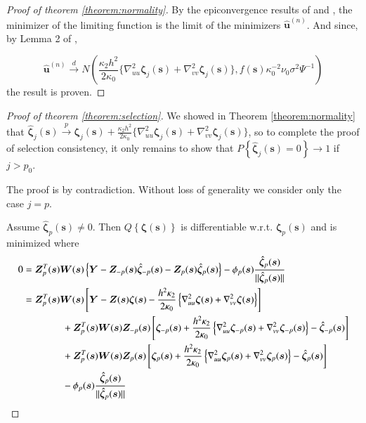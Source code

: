 \documentclass[authoryear, review, 11pt]{elsarticle}
\begin{document}
\begin{proof}[Proof of theorem \ref{theorem:normality}]
            By the epiconvergence results of \cite{Geyer-1994} and \cite{Knight-Fu-2000}, the minimizer of the limiting function is the limit of the minimizers $\hat{\bm{u}}^{(n)}$. And since, by Lemma 2 of \cite{Sun-Yan-Zhang-Lu-2014}, 

            \begin{equation}
                \hat{\bm{u}}^{(n)} \xrightarrow{d} N \left(\frac{\kappa_2 h^2}{2 \kappa_0} \{ \nabla_{uu}^2 \bm{\zeta}_j (\bm{s}) + \nabla_{vv}^2 \bm{\zeta}_j (\bm{s}) \}, f(\bm{s}) \kappa_0^{-2} \nu_0 \sigma^2 \Psi^{-1} \right)
            \end{equation}
            the result is proven.
        \end{proof}

        \begin{proof}[Proof of theorem \ref{theorem:selection}] 
            We showed in Theorem \ref{theorem:normality} that $\hat{\bm{\zeta}}_j (\bm{s}) \xrightarrow{p} \bm{\zeta}_j (\bm{s}) + \frac{\kappa_2 h^2}{2 \kappa_0} \{ \nabla_{uu}^2 \bm{\zeta}_j (\bm{s}) + \nabla_{vv}^2 \bm{\zeta}_j (\bm{s}) \}$, so to complete the proof of selection consistency, it only remains to show that $P \left\{ \hat{\bm{\zeta}}_j (\bm{s}) = 0 \right\} \to 1$ if $j > p_0$.
            
            The proof is by contradiction. Without loss of generality we consider only the case $j=p$.

            Assume $\hat{\bm{\zeta}}_p(\bm{s}) \ne 0$. Then $Q \left\{ \bm{\zeta}(\bm{s}) \right\}$ is differentiable w.r.t. $\bm{\zeta}_p(\bm{s})$ and is minimized where
            \begin{align}
                0 &= \bm{Z}_p^T(\bm{s}) \bm{W}(\bm{s}) \left\{ \bm{Y} - \bm{Z}_{-p}(\bm{s}) \hat{\bm{\zeta}}_{-p}(\bm{s}) - \bm{Z}_p(\bm{s}) \hat{\bm{\zeta}}_p(\bm{s}) \right\} - \phi_p(\bm{s}) \frac{ \hat{\bm{\zeta}}_p(\bm{s}) }{\| \hat{\bm{\zeta}}_p(\bm{s}) \|} \notag \\
                &= \bm{Z}_p^T(\bm{s}) \bm{W}(\bm{s}) \left[ \bm{Y} - \bm{Z}(\bm{s}) \bm{\zeta}(\bm{s}) - \frac{h^2 \kappa_2}{2 \kappa_0} \left\{ \nabla^2_{uu} \bm{\zeta}(\bm{s}) + \nabla^2_{vv} \bm{\zeta}(\bm{s}) \right\} \right] \notag \\
                &\mkern+72mu+ \bm{Z}_p^T(\bm{s}) \bm{W}(\bm{s}) \bm{Z}_{-p}(\bm{s}) \left[ \bm{\zeta}_{-p}(\bm{s}) + \frac{h^2 \kappa_2}{2 \kappa_0} \left\{ \nabla^2_{uu} \bm{\zeta}_{-p}(\bm{s}) + \nabla^2_{vv} \bm{\zeta}_{-p}(\bm{s}) \right\} - \hat{\bm{\zeta}}_{-p}(\bm{s}) \right] \notag \\
                &\mkern+72mu+ \bm{Z}_p^T(\bm{s}) \bm{W}(\bm{s}) \bm{Z}_p(\bm{s}) \left[ \bm{\zeta}_p(\bm{s}) + \frac{h^2 \kappa_2}{2 \kappa_0} \left\{ \nabla^2_{uu} \bm{\zeta}_p(\bm{s}) + \nabla^2_{vv} \bm{\zeta}_p(\bm{s}) \right\} - \hat{\bm{\zeta}}_p(\bm{s}) \right]  \notag \\
                &\mkern+72mu- \phi_p(\bm{s}) \frac{ \hat{\bm{\zeta}}_p(\bm{s}) }{\| \hat{\bm{\zeta}}_p(\bm{s}) \|} \notag \\
            \end{align}
        

\end{proof}
\end{document}
